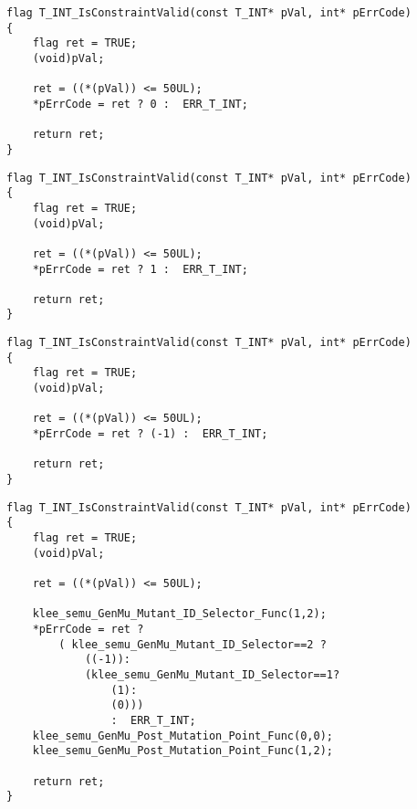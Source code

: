 


\begin{lstlisting}[style=CStyle, float=h, caption=Function T\_INT\_IsConstraintValid., label=original_meta]
flag T_INT_IsConstraintValid(const T_INT* pVal, int* pErrCode)
{
    flag ret = TRUE;
    (void)pVal;

    ret = ((*(pVal)) <= 50UL);
    *pErrCode = ret ? 0 :  ERR_T_INT;

    return ret;
}
\end{lstlisting}

\begin{lstlisting}[style=CStyle, float=h, caption=Mutant 1 of function T\_INT\_IsConstraintValid., label=meta_mutant_1]
flag T_INT_IsConstraintValid(const T_INT* pVal, int* pErrCode)
{
    flag ret = TRUE;
    (void)pVal;

    ret = ((*(pVal)) <= 50UL);
    *pErrCode = ret ? 1 :  ERR_T_INT;

    return ret;
}
\end{lstlisting}

\begin{lstlisting}[style=CStyle, float=h, caption=Mutant 2 of function T\_INT\_IsConstraintValid., label=meta_mutant_2]
flag T_INT_IsConstraintValid(const T_INT* pVal, int* pErrCode)
{
    flag ret = TRUE;
    (void)pVal;

    ret = ((*(pVal)) <= 50UL);
    *pErrCode = ret ? (-1) :  ERR_T_INT;

    return ret;
}
\end{lstlisting}

\begin{lstlisting}[style=CStyle, float=h, caption=Meta-Mutant for function T\_INT\_IsConstraintValid., label=meta_mutant_example]
flag T_INT_IsConstraintValid(const T_INT* pVal, int* pErrCode)
{
    flag ret = TRUE;
    (void)pVal;

    ret = ((*(pVal)) <= 50UL);

    klee_semu_GenMu_Mutant_ID_Selector_Func(1,2);
    *pErrCode = ret ? 
    	( klee_semu_GenMu_Mutant_ID_Selector==2 ?
    		((-1)):
		    (klee_semu_GenMu_Mutant_ID_Selector==1?
			    (1):
			    (0))) 
			    :  ERR_T_INT;
    klee_semu_GenMu_Post_Mutation_Point_Func(0,0);
    klee_semu_GenMu_Post_Mutation_Point_Func(1,2);

    return ret;
}
\end{lstlisting}